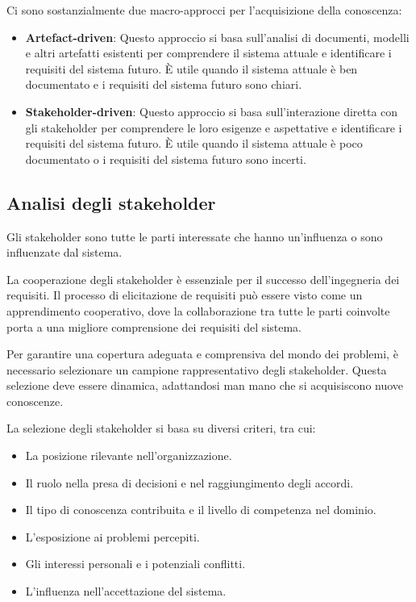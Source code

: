 Ci sono sostanzialmente due macro-approcci per l'acquisizione della conoscenza:
\begin{itemize}
    \item \textbf{Artefact-driven}: Questo approccio si basa sull'analisi
    di documenti, modelli e altri artefatti esistenti per comprendere il
    sistema attuale e identificare i requisiti del sistema futuro. È
    utile quando il sistema attuale è ben documentato e i requisiti
    del sistema futuro sono chiari.
    \item \textbf{Stakeholder-driven}: Questo approccio si basa sull'interazione
    diretta con gli stakeholder per comprendere le loro esigenze e aspettative
    e identificare i requisiti del sistema futuro. È utile quando il sistema
    attuale è poco documentato o i requisiti del sistema futuro sono incerti.
\end{itemize}
\subsection{Analisi degli stakeholder}

\begin{tcolorbox}[colback=blue!5!white,colframe=blue!75!black]
    Gli stakeholder sono tutte le parti interessate che hanno un'influenza o sono
    influenzate dal sistema.
\end{tcolorbox}

La cooperazione degli stakeholder è essenziale per il
successo dell'ingegneria dei requisiti. Il processo di elicitazione de
 requisiti può essere visto come un apprendimento cooperativo, dove la
 collaborazione tra tutte le parti coinvolte porta a una migliore comprensione
 dei requisiti del sistema.

Per garantire una copertura adeguata e comprensiva del mondo dei problemi,
è necessario selezionare un campione rappresentativo degli stakeholder.
Questa selezione deve essere dinamica, adattandosi man mano che si acquisiscono
nuove conoscenze.

La selezione degli stakeholder si basa su diversi criteri, tra cui:

\begin{itemize}
    \item La posizione rilevante nell'organizzazione.
    \item Il ruolo nella presa di decisioni e nel raggiungimento degli accordi.
    \item Il tipo di conoscenza contribuita e il livello di competenza nel dominio.
    \item L'esposizione ai problemi percepiti.
    \item Gli interessi personali e i potenziali conflitti.
    \item L'influenza nell'accettazione del sistema.
\end{itemize}

